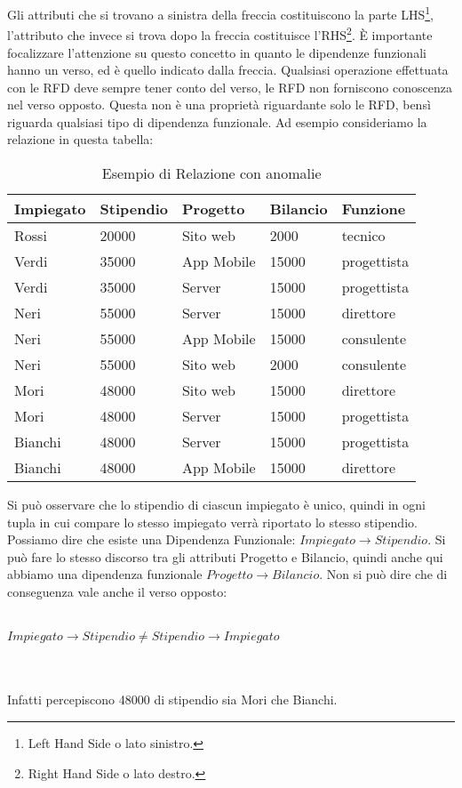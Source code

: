 Gli attributi che si trovano a sinistra della freccia costituiscono la parte LHS\footnote{Left Hand Side o lato sinistro.}, l'attributo che invece si trova dopo la freccia costituisce l'RHS\footnote{Right Hand Side o lato destro.}. 
È importante focalizzare l'attenzione su questo concetto in quanto le dipendenze funzionali hanno un verso, ed è quello indicato dalla freccia. Qualsiasi operazione effettuata con le RFD deve sempre tener conto del verso, le RFD non forniscono conoscenza nel verso opposto. Questa non è una proprietà riguardante solo le RFD, bensì riguarda qualsiasi tipo di dipendenza funzionale.
Ad esempio consideriamo la relazione in questa tabella:
\begin{table}[H]
	\centering
	\begin{tabular}{|l |l |l |l |l |}
		\hline
		Impiegato & Stipendio & Progetto & Bilancio & Funzione \\
		\hline
		Rossi & 20000  & Sito web & 2000 & tecnico\\
		Verdi & 35000 & App Mobile & 15000 & progettista\\
		Verdi & 35000 & Server & 15000 & progettista\\
		Neri & 55000 & Server & 15000 & direttore\\
		Neri & 55000 & App Mobile & 15000 & consulente\\
		Neri & 55000 & Sito web & 2000 & consulente\\
		Mori & 48000 & Sito web & 15000 & direttore\\
		Mori & 48000 & Server & 15000 & progettista\\
		Bianchi & 48000 & Server & 15000 & progettista\\
		Bianchi & 48000 & App Mobile & 15000 & direttore\\
		\hline
	\end{tabular}
	\caption{Esempio di Relazione con anomalie}
	\label{tab:relationship_anomalies}
\end{table}
Si può osservare che lo stipendio di ciascun impiegato è unico, quindi in ogni tupla in cui compare lo stesso impiegato verrà riportato lo stesso stipendio. Possiamo dire che esiste una Dipendenza Funzionale: 
$Impiegato \xrightarrow{} Stipendio$. 
Si può fare lo stesso discorso tra gli attributi Progetto e Bilancio, quindi anche qui abbiamo una dipendenza funzionale
$Progetto\xrightarrow{}Bilancio$. 
Non si può dire che di conseguenza vale anche il verso opposto:
\\~\\
\centerline{$Impiegato \xrightarrow{} Stipendio \neq Stipendio \xrightarrow{} Impiegato$} 
\\~\\
Infatti percepiscono 48000 di stipendio sia Mori che Bianchi.\cite{libroCeri}
